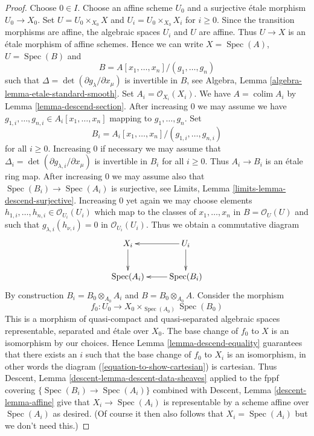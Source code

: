 \documentclass{stacks-project}
\theoremstyle{plain}
\theoremstyle{definition}
\theoremstyle{remark}
\numberwithin{equation}{subsection}
\def\colim{\mathop{\mathrm{colim}}\nolimits}
\def\Spec{\mathop{\mathrm{Spec}}}
\begin{document}
\begin{proof}
Choose $0 \in I$. Choose an affine scheme $U_0$ and a surjective
\'etale morphism $U_0 \to X_0$. Set $U = U_0 \times_{X_0} X$
and $U_i = U_0 \times_{X_0} X_i$ for $i \geq 0$. Since the transition
morphisms are affine, the algebraic spaces $U_i$ and $U$ are affine.
Thus $U \to X$ is an \'etale morphism of affine schemes. Hence we
can write $X = \Spec(A)$, $U = \Spec(B)$ and
$$
B = A[x_1, \ldots, x_n]/(g_1, \ldots, g_n)
$$
such that $\Delta = \det(\partial g_\lambda/\partial x_\mu)$ is invertible
in $B$, see Algebra, Lemma \ref{algebra-lemma-etale-standard-smooth}.
Set $A_i = \mathcal{O}_{X_i}(X_i)$. We have $A = \colim A_i$ by
Lemma \ref{lemma-descend-section}. After increasing $0$ we may assume
we have $g_{1, i}, \ldots, g_{n, i} \in A_i[x_1, \ldots, x_n]$ mapping to
$g_1, \ldots, g_n$. Set
$$
B_i = A_i[x_1, \ldots, x_n]/(g_{1, i}, \ldots, g_{n, i})
$$
for all $i \geq 0$. Increasing $0$ if necessary we may assume that
$\Delta_i = \det(\partial g_{\lambda, i}/\partial x_\mu)$ is invertible
in $B_i$ for all $i \geq 0$. Thus $A_i \to B_i$ is an \'etale ring map.
After increasing $0$ we may assume also that
$\Spec(B_i) \to \Spec(A_i)$ is surjective, see
Limits, Lemma \ref{limits-lemma-descend-surjective}. Increasing
$0$ yet again we may choose elements
$h_{1, i}, \ldots, h_{n, i} \in \mathcal{O}_{U_i}(U_i)$ which map to the
classes of $x_1, \ldots, x_n$ in $B = \mathcal{O}_U(U)$ and such that
$g_{\lambda, i}(h_{\nu, i}) = 0$ in $\mathcal{O}_{U_i}(U_i)$. Thus
we obtain a commutative diagram
\begin{equation}
\label{equation-to-show-cartesian}
\vcenter{
\xymatrix{
X_i \ar[d] & U_i \ar[l] \ar[d] \\
\Spec(A_i) & \Spec(B_i) \ar[l]
}
}
\end{equation}
By construction $B_i = B_0 \otimes_{A_0} A_i$ and
$B = B_0 \otimes_{A_0} A$. Consider the morphism
$$
f_0 : U_0 \longrightarrow X_0 \times_{\Spec(A_0)} \Spec(B_0)
$$
This is a morphism of quasi-compact and quasi-separated algebraic spaces
representable, separated and \'etale over $X_0$. The base change of $f_0$
to $X$ is an isomorphism by our choices. Hence
Lemma \ref{lemma-descend-equality}
guarantees that there exists an $i$ such that the base change of $f_0$
to $X_i$ is an isomorphism, in other words the diagram
(\ref{equation-to-show-cartesian}) is cartesian. Thus
Descent, Lemma \ref{descent-lemma-descent-data-sheaves}
applied to the fppf covering $\{\Spec(B_i) \to \Spec(A_i)\}$
combined with Descent, Lemma \ref{descent-lemma-affine}
give that $X_i \to \Spec(A_i)$ is representable by a scheme
affine over $\Spec(A_i)$ as desired. (Of course it then also follows
that $X_i = \Spec(A_i)$ but we don't need this.)
\end{proof}
\end{document}

